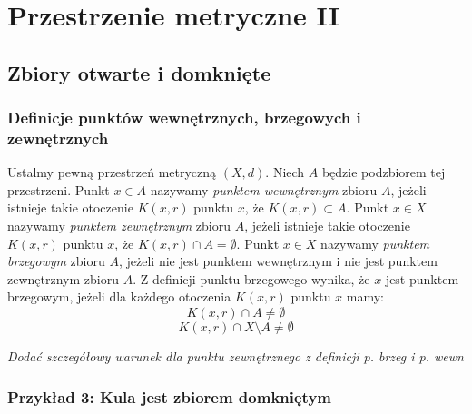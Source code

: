 \documentclass{article}
\begin{document}
\section{Przestrzenie metryczne II}
\subsection{Zbiory otwarte i domknięte}
\subsubsection{Definicje punktów wewnętrznych, brzegowych i zewnętrznych}
Ustalmy pewną przestrzeń metryczną \((X, d)\). Niech \(A\) będzie podzbiorem tej przestrzeni. Punkt \(x \in A\) nazywamy \emph{punktem wewnętrznym}
zbioru \(A\), jeżeli istnieje takie otoczenie \(K(x, r)\) punktu \(x\), że \(K(x,r) \subset A\). Punkt \(x \in X\) nazywamy
\emph{punktem zewnętrznym} zbioru \(A\), jeżeli istnieje takie otoczenie \(K(x, r)\) punktu \(x\),
że \(K(x, r) \cap A = \emptyset\). Punkt \(x \in X\) nazywamy \emph{punktem brzegowym} zbioru \(A\), jeżeli nie jest punktem
wewnętrznym i nie jest punktem zewnętrznym zbioru \(A\). Z definicji punktu brzegowego wynika, że \(x\) jest punktem
brzegowym, jeżeli dla każdego otoczenia \(K(x, r)\) punktu \(x\) mamy:
\begin{equation*}
    K(x, r) \cap A \neq \emptyset
\end{equation*}
\begin{equation*}
    K(x, r) \cap X \setminus A \neq \emptyset
\end{equation*}
\begin{center}
    \emph{Dodać szczegółowy warunek dla punktu zewnętrznego z definicji p. brzeg i p. wewn}
\end{center}
\newpage
\subsubsection{Przykład 3: Kula jest zbiorem domkniętym}
\end{document}
